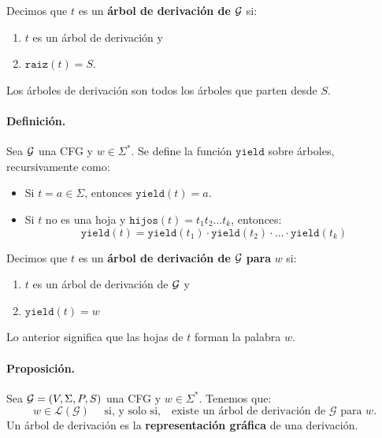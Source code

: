 Decimos que $t$ es un \textbf{árbol de derivación de} $\mathcal{G}$ si:
\begin{enumerate}
    \item $t$ es un árbol de derivación y
    \item $\texttt{raiz}(t) = S$.
\end{enumerate}
Los árboles de derivación son todos los árboles que parten desde $S$.


\paragraph{Definición.} Sea $\mathcal{G}$ una CFG y $w \in \Sigma^*$. Se define la función $\texttt{yield}$ sobre árboles, recursivamente como:
\begin{itemize}
    \item Si $t = a \in \Sigma$, entonces $\texttt{yield}(t) = a$.
    \item Si $t$ no es una hoja y $\texttt{hijos}(t) = t_1 t_2 \ldots t_k$, entonces:
          $$
              \texttt{yield}(t) =\texttt{yield}(t_1) \cdot \texttt{yield}(t_2) \cdot \ldots \cdot \texttt{yield}(t_k)
          $$
\end{itemize}

Decimos que $t$ es un \textbf{árbol de derivación de} $\mathcal{G}$ \textbf{para} $w$ si:
\begin{enumerate}
    \item $t$ es un árbol de derivación de $\mathcal{G}$ y
    \item $\texttt{yield}(t) = w$
\end{enumerate}
Lo anterior significa que las hojas de $t$ forman la palabra $w$.

\paragraph{Proposición.} Sea $\mathcal{G} = (V, \Sigma, P, S)$ una CFG y $w \in \Sigma^*$. Tenemos que:
$$
    w \in \mathcal{L}(\mathcal{G}) \quad \text { si, y solo si,} \quad \text{existe un árbol de derivación de } \mathcal{G} \text { para } w.
$$
Un árbol de derivación es la \textbf{representación gráfica} de una derivación.


